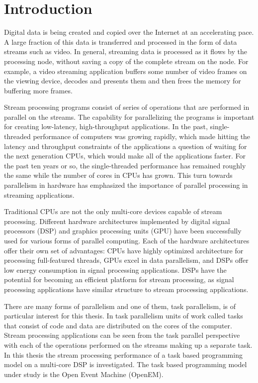 \chapter{Introduction}
\label{chapter:introduction}
Digital data is being created and copied over the Internet at an accelerating pace. A large fraction of this data is transferred and processed in the form of data streams such as video. In general, streaming data is processed as it flows by the processing node, without saving a copy of the complete stream on the node. For example, a video streaming application buffers some number of video frames on the viewing device, decodes and presents them and then frees the memory for buffering more frames.

Stream processing programs consist of series of operations that are performed in parallel on the streams. The capability for parallelizing the programs is important for creating low-latency, high-throughput applications. In the past, single-threaded performance of computers was growing rapidly, which made hitting the latency and throughput constraints of the applications a question of waiting for the next generation CPUs, which would make all of the applications faster. For the past ten years or so, the single-threaded performance has remained roughly the same while the number of cores in CPUs has grown. This turn towards parallelism in hardware has emphasized the importance of parallel processing in streaming applications.

Traditional CPUs are not the only multi-core devices capable of stream processing. Different hardware architectures implemented by digital signal processors (DSP) and graphics processing units (GPU) have been successfully used for various forms of parallel computing. Each of the hardware architectures offer their own set of advantages: CPUs have highly optimized architecture for processing full-featured threads, GPUs excel in data parallelism, and DSPs offer low energy consumption in signal processing applications. DSPs have the potential for becoming an efficient platform for stream processing, as signal processing applications have similar structure to stream processing applications.

There are many forms of parallelism and one of them, task parallelism, is of particular interest for this thesis. In task parallelism units of work called tasks that consist of code and data are distributed on the cores of the computer. Stream processing applications can be seen from the task parallel perspective with each of the operations performed on the streams making up a separate task. In this thesis the stream processing performance of a task based programming model on a multi-core DSP is investigated. The task based programming model under study is the Open Event Machine (OpenEM).

